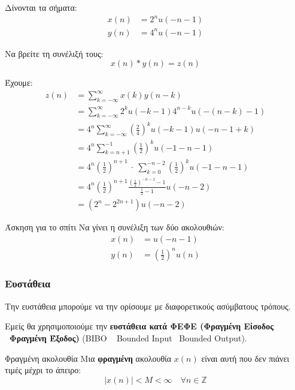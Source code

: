 \documentclass[11pt,a4paper,notitlepage,fleqn]{article}
\begin{document}
\begin{exercise}
	Δίνονται τα σήματα:
	\begin{align*}
	x(n) &= 2^n u(-n-1)\\
	y(n) &= 4^n u(-n-1)
	\end{align*}
	
	Να βρείτε τη συνέλιξή τους:
	\[
	x(n) * y(n) = z(n)
	\]
	
	\tcblower
	Έχουμε:
	\begin{align*}
		z(n) &= \sum_{k=-\infty}^{\infty} x(k)y(n-k)
		\\ &= \sum_{k=-\infty}^{\infty}
		2^k u(-k-1) 4^{n-k} u \left(-(n-k)-1\right)
		\\ &= 4^n\sum_{k=-\infty}^{\infty}\left(\frac{2}{4}\right)^k u(-k-1)u(-n-1+k)
		\\ &= 4^n\sum_{k=n+1}^{-1} \left(\frac{1}{2}\right)^k u(-1-n-1)
		\\ &= 4^n\left(\frac{1}{2}\right)^{n+1}\ \cdot \ \sum_{k=0}^{-n-2}\left(\frac{1}{2}\right)^k
		u(-1-n-1)
		\\ &= 4^n \left(\frac{1}{2}\right)^{n+1}
		\frac{\left(\frac{1}{2}\right)^{-n-1}-1}{\frac{1}{2}-1}u(-n-2)
		\\ &= \left(2^n-2^{2n+1}\right)u(-n-2)
	\end{align*}
\end{exercise}

\begin{questionbox}{Άσκηση για το σπίτι}
	Να γίνει η συνέλιξη των δύο ακολουθιών:
	\begin{align*}
		x(n) &= u(-n-1)\\
		y(n) &= \left(\frac{1}{2}\right)^n u(n)
	\end{align*}
\end{questionbox}


\subsubsection{Ευστάθεια}
Την ευστάθεια μπορούμε να την ορίσουμε με διαφορετικούς ασύμβατους τρόπους.

Εμείς θα χρησιμοποιούμε την \textbf{ευστάθεια κατά ΦΕΦΕ (Φραγμένη Είσοδος \textendash~Φραγμένη Έξοδος)} (BIBO \textemdash~ Bounded Input \textendash~Bounded Output).

\begin{defn}{Φραγμένη ακολουθία}{}
	Μια \textbf{φραγμένη} ακολουθία \( x(n) \) είναι αυτή που δεν πιάνει τιμές μέχρι το άπειρο:
	\[
	\left|x(n)\right| < M < \infty \quad \forall n \in \mathbb Z
	\]
\end{defn}
\end{document}
